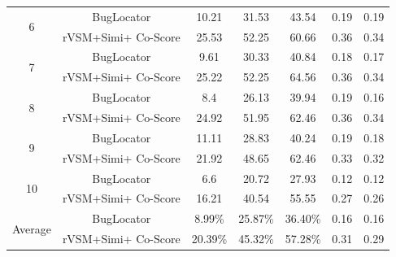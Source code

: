 \documentclass[conference]{IEEEtran}
\begin{document}
\begin{table}[htbp]
{\begin{tabular}{c|c|c|c|c|c|c}
			\multirow{2}{*}{6}  &BugLocator     &  10.21& 31.53&43.54& 0.19 & 0.19 \\  \cline{2-7}
			& rVSM+Simi+ Co-Score
			&25.53 &
			52.25 &
			60.66 & 0.36 &
			0.34     \\  \hline
			\multirow{2}{*}{7}  &BugLocator     &  9.61& 30.33&40.84& 0.18 & 0.17 \\ \cline{2-7}
			& rVSM+Simi+ Co-Score
			&25.22 &
			52.25 &
			64.56 & 0.36 &
			0.34     \\  \hline
			\multirow{2}{*}{8}  &BugLocator     &  8.4& 26.13&39.94& 0.19 & 0.16 \\ \cline{2-7}
			& rVSM+Simi+ Co-Score
			&24.92 &
			51.95 &
			62.46 & 0.36 &
			0.34    \\  \hline
			\multirow{2}{*}{9}  &BugLocator     &  11.11& 28.83&40.24& 0.19 & 0.18 \\  \cline{2-7}
			& rVSM+Simi+ Co-Score
			&21.92 &
			48.65 &
			62.46 & 0.33 &
			0.32    \\  \hline
			\multirow{2}{*}{10}  &BugLocator     &  6.6& 20.72&27.93& 0.12 & 0.12 \\  \cline{2-7}
			& rVSM+Simi+ Co-Score
			&16.21 &
			40.54 &
			55.55 & 0.27 &
			0.26    \\  \hline \hline
			\multirow{2}{*}{Average}       &BugLocator     &  8.99\%& 25.87\%&36.40\%& 0.16 & 0.16  \\ \cline{2-7}
			& rVSM+Simi+ Co-Score                                                                                                                         & 20.39\%                                                 & 45.32\%                                                 & 57.28\%                                                  &   0.31  &  0.29    \\ 
			\hline
\end{tabular}}
\centering
\end{table}
\end{document}
